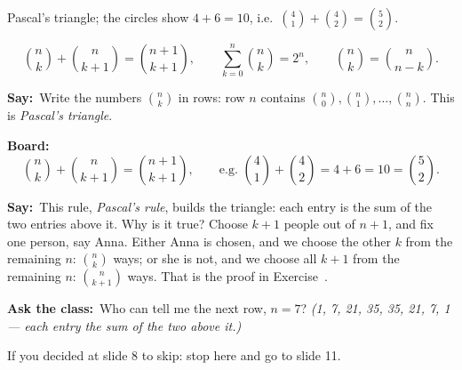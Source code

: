 \documentclass[11pt,a4paper,parskip=half]{scrartcl}
\newcommand{\say}{\textbf{\color{teal}Say:}\ }
\newcommand{\board}{\textbf{\color{gold}Board:}\ }
\newcommand{\ask}{\textbf{\color{navy}Ask the class:}\ }
\begin{document}
\needspace{0.3\textheight}
\begin{slidefig}
	Pascal's triangle; the circles show $4+6=10$, i.e.\
	$\binom41+\binom42=\binom52$.
	\begin{center}
	\end{center}
	\begin{printeq}
	\[ \binom nk+\binom n{k+1}=\binom{n+1}{k+1},\qquad
		\sum_{k=0}^n\binom nk=2^n,\qquad \binom nk=\binom n{n-k}. \]
	\end{printeq}
\end{slidefig}

\say Write the numbers $\binom nk$ in rows: row $n$ contains
$\binom n0,\binom n1,\dots,\binom nn$. This is \emph{Pascal's triangle}.

\board
\[ \binom nk+\binom n{k+1}=\binom{n+1}{k+1},\qquad\text{e.g. }
	\binom41+\binom42=4+6=10=\binom52. \]

\say This rule, \emph{Pascal's rule}, builds the triangle: each entry is the
sum of the two entries above it. Why is it true? Choose $k+1$ people out of
$n+1$, and fix one person, say Anna. Either Anna is chosen, and we choose the
other $k$ from the remaining $n$: $\binom nk$ ways; or she is not, and we
choose all $k+1$ from the remaining $n$: $\binom n{k+1}$ ways. That is the
proof in Exercise~\exref{pascals-rule}.

\ask Who can tell me the next row, $n=7$? \emph{(1, 7, 21, 35, 35, 21, 7, 1
--- each entry the sum of the two above it.)}

\begin{slidecue}
	If you decided at slide 8 to skip: stop here and go to slide 11.
\end{slidecue}
\end{document}
